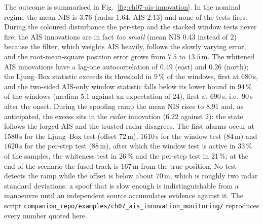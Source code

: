 \documentclass[graybox,envcountchap]{style/SNmono}
\newcommand{\repopath}[1]{\texttt{#1}}
\begin{document}
\begin{example}
The outcome is summarised in Fig.~\ref{fig:ch07-ais-innovation}. In the nominal regime the mean NIS is $3.76$ (radar $1.64$, AIS $2.13$) and none of the tests fires. During the coloured disturbance the per-step and the stacked window tests never fire; the AIS innovations are in fact \emph{too small} (mean NIS $0.43$ instead of $2$) because the filter, which weights AIS heavily, follows the slowly varying error, and the root-mean-square position error grows from $7.5$ to $13.5$\,m. The whitened AIS innovations have a lag-one autocorrelation of $0.49$ (east) and $0.26$ (north); the Ljung--Box statistic exceeds its threshold in $9\,\%$ of the windows, first at $680$\,s, and the two-sided AIS-only window statistic falls below its lower bound in $94\,\%$ of the windows (median $5.1$ against an expectation of $24$), first at $690$\,s, i.e.\ $90$\,s after the onset. During the spoofing ramp the mean NIS rises to $8.91$ and, as anticipated, the excess sits in the \emph{radar} innovation ($6.22$ against $2$): the state follows the forged AIS and the trusted radar disagrees. The first alarms occur at $1580$\,s for the Ljung--Box test (offset $72$\,m), $1610$\,s for the window test ($84$\,m) and $1620$\,s for the per-step test ($88$\,m), after which the window test is active in $33\,\%$ of the samples, the whiteness test in $26\,\%$ and the per-step test in $21\,\%$; at the end of the scenario the fused track is $167$\,m from the true position. No test detects the ramp while the offset is below about $70$\,m, which is roughly two radar standard deviations: a spoof that is slow enough is indistinguishable from a manoeuvre until an independent source accumulates evidence against it. The script \repopath{companion\_\allowbreak repo/\allowbreak examples/\allowbreak ch07\_\allowbreak ais\_\allowbreak innovation\_\allowbreak monitoring/\allowbreak } reproduces every number quoted here.
\end{example}
\end{document}
